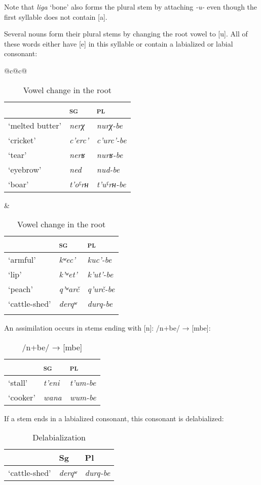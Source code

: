 ﻿\documentclass[output=paper]{langsci/langscibook}
\begin{document}
Note that \emph{liga} `bone' also forms the plural stem by attaching
\emph{-u-} even though the first syllable does not contain [a].

Several nouns form their plural stems by changing the root vowel to
[u]. All of these words either have [e] in this syllable or
contain a labialized or labial consonant:

\begin{table}[h]
  \caption{Vowel change in the root}

  \begin{tabular}{@{}c@{\qquad}c@{}}
\toprule
\begin{tabular}{@{}lll@{}}
& \textsc{sg} & \textsc{pl}\tabularnewline \midrule
`melted butter' & \emph{nerχ} & \emph{nurχ-be}\tabularnewline
`cricket' & \emph{c'erc'} & \emph{c'urc'-be}\tabularnewline
`tear' & \emph{nerʁ} & \emph{nurʁ-be}\tabularnewline
`eyebrow' & \emph{ned} & \emph{nud-be}\tabularnewline
`boar' & \emph{t'oˤrʜ} & \emph{t'uˤrʜ-be}\tabularnewline
\end{tabular} & 
\begin{tabular}{@{}lll@{}}
& \textsc{sg} & \textsc{pl}\tabularnewline \midrule
 `armful' & \emph{kʷec'} & \emph{kuc'-be}\tabularnewline
 `lip' & \emph{k'ʷet'} & \emph{k'ut'-be}\tabularnewline
 `peach' & \emph{q'ʷarč} & \emph{q'urč-be}\tabularnewline
 `cattle-shed' & \emph{derqʷ} & \emph{durq-be}\tabularnewline
& & \tabularnewline
\end{tabular}\tabularnewline
    \bottomrule
\end{tabular}
\end{table}

\pagebreak

An assimilation occurs in stems ending with [n]: /n+be/ →
[mbe]:

\begin{table}[h]
  \caption{/n+be/ → [mbe]}
  
\begin{tabular}{@{}lll@{}}
\toprule
& \textsc{sg} & \textsc{pl}\tabularnewline\midrule
`stall' & \emph{t'eni} & \emph{t'um-be}\tabularnewline
`cooker' & \emph{wana} & \emph{wum-be}\tabularnewline
\bottomrule
\end{tabular}
\end{table}

If a stem ends in a labialized consonant, this consonant is
delabialized:

\begin{table}[h]
  \caption{Delabialization}
  
\begin{tabular}{@{}lll@{}}
\toprule
& Sg & Pl\tabularnewline\midrule
`cattle-shed' & \emph{derqʷ} & \emph{durq-be}\tabularnewline
\bottomrule
\end{tabular}
\end{table}
\end{document}
